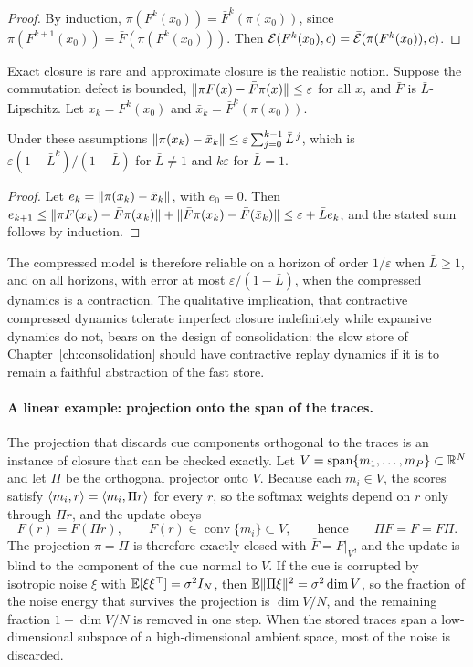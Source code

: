 \begin{proof}
By induction, $\pi(F^k(x_0))=\bar F^k(\pi(x_0))$, since $\pi(F^{k+1}(x_0))=\bar F(\pi(F^k(x_0)))$. Then $\mathcal{E}(F^k(x_0),c)=\bar{\mathcal{E}}(\pi(F^k(x_0)),c)$.
\end{proof}

Exact closure is rare and approximate closure is the realistic notion. Suppose the commutation defect is bounded, $\lVert \pi F(x)-\bar F\pi(x)\rVert\le\varepsilon$ for all $x$, and $\bar F$ is $\bar L$-Lipschitz. Let $x_k=F^k(x_0)$ and $\bar x_k=\bar F^k(\pi(x_0))$.

\begin{proposition}\label{prop:drift2}
Under these assumptions $\lVert \pi(x_k)-\bar x_k\rVert\le\varepsilon\sum_{j=0}^{k-1}\bar L^{\,j}$, which is $\varepsilon(1-\bar L^{k})/(1-\bar L)$ for $\bar L\ne1$ and $k\varepsilon$ for $\bar L=1$.
\end{proposition}

\begin{proof}
Let $e_k=\lVert \pi(x_k)-\bar x_k\rVert$, with $e_0=0$. Then $e_{k+1}\le\lVert \pi F(x_k)-\bar F\pi(x_k)\rVert+\lVert \bar F\pi(x_k)-\bar F(\bar x_k)\rVert\le\varepsilon+\bar Le_k$, and the stated sum follows by induction.
\end{proof}

The compressed model is therefore reliable on a horizon of order $1/\varepsilon$ when $\bar L\ge1$, and on all horizons, with error at most $\varepsilon/(1-\bar L)$, when the compressed dynamics is a contraction. The qualitative implication, that contractive compressed dynamics tolerate imperfect closure indefinitely while expansive dynamics do not, bears on the design of consolidation: the slow store of Chapter~\ref{ch:consolidation} should have contractive replay dynamics if it is to remain a faithful abstraction of the fast store.

\paragraph{A linear example: projection onto the span of the traces.}
The projection that discards cue components orthogonal to the traces is an instance of closure that can be checked exactly. Let $V=\operatorname{span}\{m_1,\dots,m_P\}\subset\mathbb{R}^N$ and let $\Pi$ be the orthogonal projector onto $V$. Because each $m_i\in V$, the scores satisfy $\langle m_i,r\rangle=\langle m_i,\Pi r\rangle$ for every $r$, so the softmax weights depend on $r$ only through $\Pi r$, and the update obeys
\begin{equation}\label{eq:blind}
F(r)=F(\Pi r),\qquad F(r)\in\operatorname{conv}\{m_i\}\subset V,\qquad\text{hence}\qquad \Pi F=F=F\Pi.
\end{equation}
The projection $\pi=\Pi$ is therefore exactly closed with $\bar F=F|_V$, and the update is blind to the component of the cue normal to $V$. If the cue is corrupted by isotropic noise $\xi$ with $\mathbb{E}[\xi\xi^\top]=\sigma^2 I_N$, then $\mathbb{E}\lVert \Pi\xi\rVert^2=\sigma^2\dim V$, so the fraction of the noise energy that survives the projection is $\dim V/N$, and the remaining fraction $1-\dim V/N$ is removed in one step. When the stored traces span a low-dimensional subspace of a high-dimensional ambient space, most of the noise is discarded.

